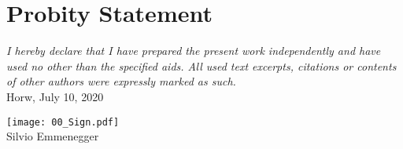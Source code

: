 \section*{Probity Statement}


\textit{I hereby declare that I have prepared the present work independently and have used no other than the specified aids. All used text excerpts, citations or contents of other authors were expressly marked as such.}
\\
Horw, July 10, 2020
\\[2cm]
\begin{flushright}
    \texttt{[image: 00\_Sign.pdf]}
    \\
    \vspace{-3mm}
	Silvio Emmenegger
\end{flushright}